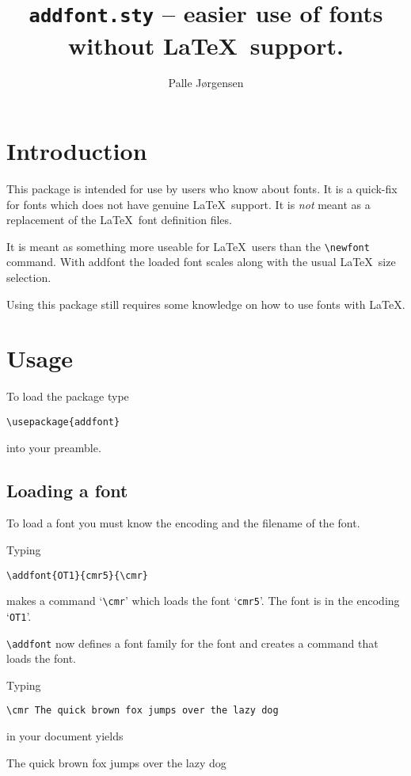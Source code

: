\documentclass[12pt,british,parskip=half]{scrartcl}
\title{\texttt{addfont.sty} -- easier use of fonts without \LaTeX\
  support.} \author{Palle Jørgensen}
\begin{document}
\maketitle

\section{Introduction}
\label{sec:introduction}

This package is intended for use by users who know about fonts. It is
a quick-fix for fonts which does not have genuine \LaTeX\ support. It
is \emph{not} meant as a replacement of the \LaTeX\ font definition
files.

It is meant as something more useable for \LaTeX\ users than the
\lstinline+\newfont+ command. With addfont the loaded font scales
along with the usual \LaTeX\ size selection.

Using this package still requires some knowledge on how to use fonts
with \LaTeX.

\section{Usage}
\label{sec:usage}

To load the package type
\begin{lstlisting}
\usepackage{addfont}
\end{lstlisting}
into your preamble.

\subsection{Loading a font}
\label{sec:loading-font}

To load a font you must know the encoding and the filename of the font.

Typing
\begin{lstlisting}
\addfont{OT1}{cmr5}{\cmr}
\end{lstlisting}
makes a command `\lstinline|\cmr|' which loads the font
`\lstinline|cmr5|'. The font is in the encoding `\lstinline|OT1|'.

\lstinline|\addfont| now defines a font family for the font and creates
a command that loads the font.

Typing
\begin{lstlisting}[morekeywords=cmr]
\cmr The quick brown fox jumps over the lazy dog
\end{lstlisting}
in your document yields

{\cmr The quick brown fox jumps over the lazy dog}
\end{document}
